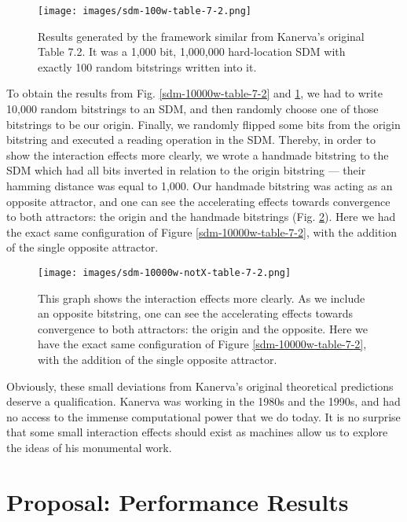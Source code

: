 \begin{figure}[h]
\centering\texttt{[image: images/sdm-100w-table-7-2.png]}
\caption{Results generated by the framework similar from Kanerva's original Table 7.2. It was a 1,000 bit, 1,000,000 hard-location SDM with exactly 100 random bitstrings written into it.
\label{sdm-100w-table-7-2}}
\end{figure}

To obtain the results from Fig. \ref{sdm-10000w-table-7-2} and \ref{sdm-100w-table-7-2}, we had to write 10,000 random bitstrings to an SDM, and then randomly choose one of those bitstrings to be our origin. Finally, we randomly flipped some bits from the origin bitstring and executed a reading operation in the SDM. Thereby, in order to show the interaction effects more clearly, we wrote a handmade bitstring to the SDM which had all bits inverted in relation to the origin bitstring --- their hamming distance was equal to 1,000. Our handmade bitstring was acting as an opposite attractor, and one can see the accelerating effects towards convergence to both attractors: the origin and the handmade bitstrings (Fig. \ref{sdm-10000w-notX-table-7-2}). Here we had the exact same configuration of Figure \ref{sdm-10000w-table-7-2}, with the addition of the single opposite attractor.

\begin{figure}[h]
\centering\texttt{[image: images/sdm-10000w-notX-table-7-2.png]}
\caption{This graph shows the interaction effects more clearly.  As we include an opposite bitstring, one can see the accelerating effects towards convergence to both attractors: the origin and the opposite. Here we have the exact same configuration of Figure \ref{sdm-10000w-table-7-2}, with the addition of the single opposite attractor. 
\label{sdm-10000w-notX-table-7-2}}
\end{figure}

Obviously, these small deviations from Kanerva's original theoretical predictions deserve a qualification.  Kanerva was working in the 1980s and the 1990s, and had no access to the immense computational power that we do today. It is no surprise that some small interaction effects should exist as machines allow us to explore the ideas of his monumental work.

\section{Proposal: Performance Results}


